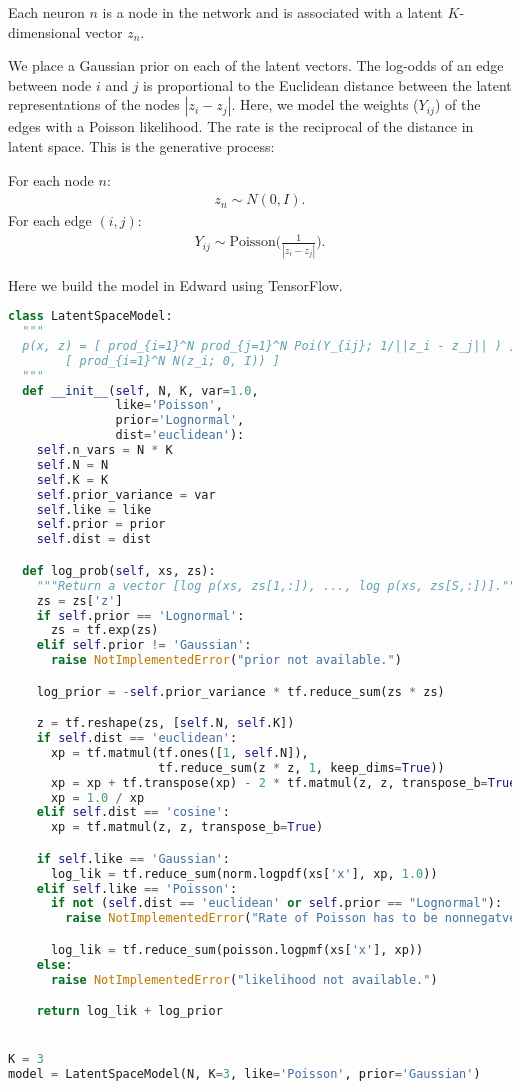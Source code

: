 Each neuron $n$ is a node in the network and is associated with a latent
$K$-dimensional vector $z_n$.

We place a Gaussian prior on each of the latent vectors.
The log-odds of an edge between node $i$ and
$j$ is proportional to the Euclidean distance between the latent
representations of the nodes $|z_i- z_j|$. Here, we
model the weights ($Y_{ij}$) of the edges with a Poisson likelihood.
The rate is the reciprocal of the distance in latent space. This is
the generative process:

For each node $n$:
\begin{align}
z_n \sim N(0,I).
\end{align}
For each edge $(i,j)$:
\begin{align}
Y_{ij} \sim \text{Poisson}\Bigg(\frac{1}{|z_i - z_j|}\Bigg).
\end{align}

Here we build the model in Edward using TensorFlow.
\begin{lstlisting}[language=Python]
class LatentSpaceModel:
  """
  p(x, z) = [ prod_{i=1}^N prod_{j=1}^N Poi(Y_{ij}; 1/||z_i - z_j|| ) ]
        [ prod_{i=1}^N N(z_i; 0, I)) ]
  """
  def __init__(self, N, K, var=1.0,
               like='Poisson',
               prior='Lognormal',
               dist='euclidean'):
    self.n_vars = N * K
    self.N = N
    self.K = K
    self.prior_variance = var
    self.like = like
    self.prior = prior
    self.dist = dist

  def log_prob(self, xs, zs):
    """Return a vector [log p(xs, zs[1,:]), ..., log p(xs, zs[S,:])]."""
    zs = zs['z']
    if self.prior == 'Lognormal':
      zs = tf.exp(zs)
    elif self.prior != 'Gaussian':
      raise NotImplementedError("prior not available.")

    log_prior = -self.prior_variance * tf.reduce_sum(zs * zs)

    z = tf.reshape(zs, [self.N, self.K])
    if self.dist == 'euclidean':
      xp = tf.matmul(tf.ones([1, self.N]),
                     tf.reduce_sum(z * z, 1, keep_dims=True))
      xp = xp + tf.transpose(xp) - 2 * tf.matmul(z, z, transpose_b=True)
      xp = 1.0 / xp
    elif self.dist == 'cosine':
      xp = tf.matmul(z, z, transpose_b=True)

    if self.like == 'Gaussian':
      log_lik = tf.reduce_sum(norm.logpdf(xs['x'], xp, 1.0))
    elif self.like == 'Poisson':
      if not (self.dist == 'euclidean' or self.prior == "Lognormal"):
        raise NotImplementedError("Rate of Poisson has to be nonnegatve.")

      log_lik = tf.reduce_sum(poisson.logpmf(xs['x'], xp))
    else:
      raise NotImplementedError("likelihood not available.")

    return log_lik + log_prior


K = 3
model = LatentSpaceModel(N, K=3, like='Poisson', prior='Gaussian')
\end{lstlisting}


